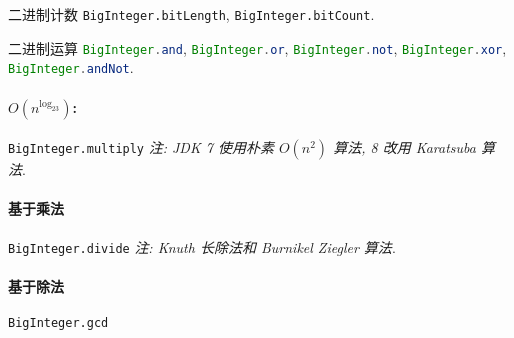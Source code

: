 二进制计数 \lstinline{BigInteger.bitLength}, \lstinline{BigInteger.bitCount}.

二进制运算 \lstinline[language=Java]{BigInteger.and}, \lstinline[language=Java]{BigInteger.or}, \lstinline[language=Java]{BigInteger.not}, \lstinline[language=Java]{BigInteger.xor}, \lstinline[language=Java]{BigInteger.andNot}.

\paragraph{$O(n^{\log_23})$:} \lstinline{BigInteger.multiply} \textit{注: JDK 7 使用朴素 $O(n^2)$ 算法, 8 改用 Karatsuba 算法}.

\paragraph{基于乘法} \lstinline{BigInteger.divide} \textit{注: Knuth 长除法和 Burnikel Ziegler 算法}.

\paragraph{基于除法} \lstinline{BigInteger.gcd}
